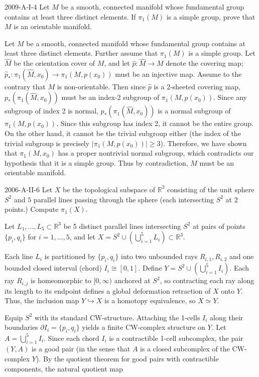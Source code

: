 \documentclass{article}
\begin{document}
	\begin{prb}{2009-A-I-4}
		Let $M$ be a smooth, connected manifold whose fundamental group contains at least three distinct elements. If $\pi_1(M)$ is a simple group, prove that $M$ is an orientable manifold. 
	\end{prb}
	Let $M$ be a smooth, connected manifold whose fundamental group contains at least three distinct elements. Further assume that $\pi_1(M)$ is a simple group. Let $\hat{M}$ be the orientation cover of $M$, and let $\hat{p}: \hat{M} \to M$ denote the covering map; $\hat{p}_{\ast}: \pi_1(\hat{M}, x_0) \to \pi_1(M, p(x_0))$ must be an injective map. Assume to the contrary that $M$ is non-orientable. Then since $\hat{p}$ is a 2-sheeted covering map, $p_\ast(\pi_1(\hat{M}, x_0))$ must be an index-2 subgroup of $\pi_1(M, p(x_0))$. Since any subgroup of index 2 is normal, $p_\ast(\pi_1(\hat{M}, x_0))$ is a normal subgroup of $\pi_1(M, p(x_0))$. Since this subgroup has index 2, it cannot be the entire group. On the other hand, it cannot be the trivial subgroup either (the index of the trivial subgroup is precisely $|\pi_1(M, p(x_0))| \geq 3$). Therefore, we have shown that $\pi_1(M, x_0)$ has a proper nontrivial normal subgroup, which contradicts our hypothesis that it is a simple group. Thus by contradiction, $M$ must be an orientable manifold. 
	
	\begin{prb}{2006-A-II-6}
		Let $X$ be the topological subspace of $\mathbb{R}^3$ consisting of the unit sphere $S^2$ and $5$ parallel lines passing through the sphere (each intersecting $S^2$ at 2 points.) Compute $\pi_1(X)$. 
	\end{prb}
	Let $L_1, \dots, L_5 \subset \mathbb{R}^3$ be 5 distinct parallel lines intersecting $S^2$ at pairs of points $\{p_i, q_i\}$ for $i = 1, \dots, 5$, and let $X = S^2 \cup \left(\bigcup_{i=1}^5 L_i\right) \subset \mathbb{R}^3$.
	
	Each line $L_i$ is partitioned by $\{p_i, q_i\}$ into two unbounded rays $R_{i,1}, R_{i,2}$ and one bounded closed interval (chord) $I_i \cong [0, 1]$. Define $Y = S^2 \cup \left(\bigcup_{i=1}^5 I_i\right)$. Each ray $R_{i,j}$ is homeomorphic to $[0, \infty)$ anchored at $S^2$, so contracting each ray along its length to its endpoint defines a global deformation retraction of $X$ onto $Y$. Thus, the inclusion map $Y \hookrightarrow X$ is a homotopy equivalence, so $X \simeq Y$.
	
	Equip $S^2$ with its standard CW-structure. Attaching the 1-cells $I_i$ along their boundaries $\partial I_i = \{p_i, q_i\}$ yields a finite CW-complex structure on $Y$. Let $A = \bigcup_{i=1}^5 I_i$. Since each chord $I_i$ is a contractible 1-cell subcomplex, the pair $(Y, A)$ is a good pair (in the sense that $A$ is a closed subcomplex of the CW-complex $Y$). By the quotient theorem for good pairs with contractible components, the natural quotient map
	
\end{document}
